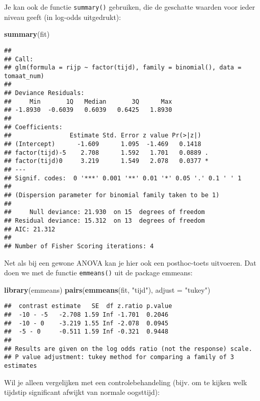 \documentclass[]{book}
\newenvironment{Shaded}{\begin{snugshade}}{\end{snugshade}}
\newcommand{\KeywordTok}[1]{\textcolor[rgb]{0.13,0.29,0.53}{\textbf{{#1}}}}
\newcommand{\DataTypeTok}[1]{\textcolor[rgb]{0.13,0.29,0.53}{{#1}}}
\newcommand{\StringTok}[1]{\textcolor[rgb]{0.31,0.60,0.02}{{#1}}}
\newcommand{\NormalTok}[1]{{#1}}
\theoremstyle{definition}
\theoremstyle{definition}
\theoremstyle{definition}
\theoremstyle{remark}
\begin{document}
Je kan ook de functie \texttt{summary()} gebruiken, die de geschatte
waarden voor ieder niveau geeft (in log-odds uitgedrukt):

\begin{Shaded}
\begin{Highlighting}[]
\KeywordTok{summary}\NormalTok{(fit)}
\end{Highlighting}
\end{Shaded}

\begin{verbatim}
## 
## Call:
## glm(formula = rijp ~ factor(tijd), family = binomial(), data = tomaat_num)
## 
## Deviance Residuals: 
##     Min       1Q   Median       3Q      Max  
## -1.8930  -0.6039   0.6039   0.6425   1.8930  
## 
## Coefficients:
##                Estimate Std. Error z value Pr(>|z|)  
## (Intercept)      -1.609      1.095  -1.469   0.1418  
## factor(tijd)-5    2.708      1.592   1.701   0.0889 .
## factor(tijd)0     3.219      1.549   2.078   0.0377 *
## ---
## Signif. codes:  0 '***' 0.001 '**' 0.01 '*' 0.05 '.' 0.1 ' ' 1
## 
## (Dispersion parameter for binomial family taken to be 1)
## 
##     Null deviance: 21.930  on 15  degrees of freedom
## Residual deviance: 15.312  on 13  degrees of freedom
## AIC: 21.312
## 
## Number of Fisher Scoring iterations: 4
\end{verbatim}

Net als bij een gewone ANOVA kan je hier ook een posthoc-toets
uitvoeren. Dat doen we met de functie \texttt{emmeans()} uit de package
emmeans:

\begin{Shaded}
\begin{Highlighting}[]
\KeywordTok{library}\NormalTok{(emmeans)}
\KeywordTok{pairs}\NormalTok{(}\KeywordTok{emmeans}\NormalTok{(fit, }\StringTok{"tijd"}\NormalTok{), }\DataTypeTok{adjust =} \StringTok{"tukey"}\NormalTok{)}
\end{Highlighting}
\end{Shaded}

\begin{verbatim}
##  contrast estimate   SE  df z.ratio p.value
##  -10 - -5   -2.708 1.59 Inf -1.701  0.2046 
##  -10 - 0    -3.219 1.55 Inf -2.078  0.0945 
##  -5 - 0     -0.511 1.59 Inf -0.321  0.9448 
## 
## Results are given on the log odds ratio (not the response) scale. 
## P value adjustment: tukey method for comparing a family of 3 estimates
\end{verbatim}

Wil je alleen vergelijken met een controlebehandeling (bijv. om te
kijken welk tijdstip significant afwijkt van normale oogsttijd):
\end{document}
